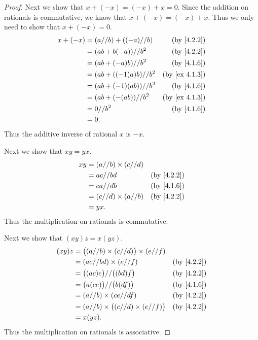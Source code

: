 \begin{proof}
  Next we show that \(x + (-x) = (-x) + x = 0\).
  Since the addition on rationals is commutative, we know that \(x + (-x) = (-x) + x\).
  Thus we only need to show that \(x + (-x) = 0\).
  \begin{align*}
    x + (-x) & = (a // b) + ((-a) // b) & \text{(by \cref{4.2.2})}    \\
             & = (ab + b(-a)) // b^2    & \text{(by \cref{4.2.2})}    \\
             & = (ab + (-a)b) // b^2    & \text{(by \cref{4.1.6})}    \\
             & = (ab + ((-1)a)b) // b^2 & \text{(by \cref{ex 4.1.3})} \\
             & = (ab + (-1)(ab)) // b^2 & \text{(by \cref{4.1.6})}    \\
             & = (ab + (-(ab)) // b^2   & \text{(by \cref{ex 4.1.3})} \\
             & = 0 // b^2               & \text{(by \cref{4.1.6})}    \\
             & = 0.
  \end{align*}
  Thus the additive inverse of rational \(x\) is \(-x\).

  Next we show that \(xy = yx\).
  \begin{align*}
    xy & = (a // b) \times (c // d)                            \\
       & = ac // bd                 & \text{(by \cref{4.2.2})} \\
       & = ca // db                 & \text{(by \cref{4.1.6})} \\
       & = (c // d) \times (a // b) & \text{(by \cref{4.2.2})} \\
       & = yx.
  \end{align*}
  Thus the multiplication on rationals is commutative.

  Next we show that \((xy)z = x(yz)\).
  \begin{align*}
    (xy)z & = \big((a // b) \times (c // d)\big) \times (e // f)                            \\
          & = (ac // bd) \times (e // f)                         & \text{(by \cref{4.2.2})} \\
          & = \big((ac)e\big) // \big((bd)f\big)                 & \text{(by \cref{4.2.2})} \\
          & = \big(a(ce)\big) // \big(b(df)\big)                 & \text{(by \cref{4.1.6})} \\
          & = (a // b) \times (ce // df)                         & \text{(by \cref{4.2.2})} \\
          & = (a // b) \times \big((c // d) \times (e // f)\big) & \text{(by \cref{4.2.2})} \\
          & = x(yz).
  \end{align*}
  Thus the multiplication on rationals is associative.


\end{proof}
